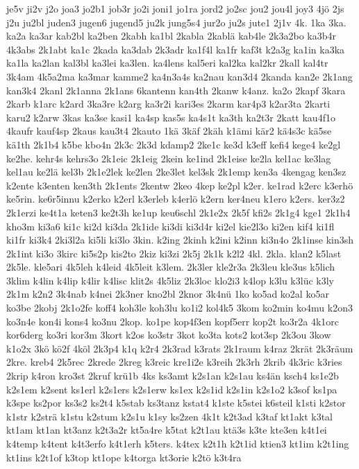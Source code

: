 {je5v
ji2v
j2o
joa3
jo2b1
job3r
jo2i
joni1
jo1ra
jord2
jo2sc
jou2
jou4l
joy3
4jö
2js
j2u
ju2bl
juden3
jugen6
jugend5
ju2k
jung5s4
jur2o
ju2s
jute1
2j1v
4k.
1ka
3ka.
ka2a
ka3ar
kab2bl
ka2ben
2kabh
ka1bl
2kabla
2kablä
kab4le
2k3a2bo
ka3b4r
4k3abs
2k1abt
ka1c
2kada
ka3dab
2k3adr
ka1f4l
ka1fr
kaf3t
k2a3g
ka1in
ka3ka
ka1la
ka2lan
kal3bl
ka3lei
ka3len.
ka4lens
kal5eri
kal2ka
kal2kr
2kall
kal4tr
3k4am
4k5a2ma
ka3mar
kamme2
ka4n3a4s
ka2nau
kan3d4
2kanda
kan2e
2k1ang
kan3k4
2kanl
2k1anna
2k1ans
6kantenn
kan4th
2kanw
k4anz.
ka2o
2kapf
3kara
2karb
k1arc
k2ard
3ka3re
k2arg
ka3r2i
kari3es
2karm
kar4p3
k2ar3ta
2karti
karu2
k2arw
3kas
ka3se
kasi1
ka4sp
kas5s
ka4s1t
ka3th
ka2t3r
2katt
kau4f1o
4kaufr
kauf4sp
2kaus
kau3t4
2kauto
1kä
3käf
2käh
k1ämi
kär2
kä4s3c
kä5se
kä1th
2k1b4
k5be
kbo4n
2k3c
2k3d
kdamp2
2ke1c
ke3d
k3eff
kefi4
kege4
ke2gl
ke2he.
kehr4s
kehrs3o
2k1eic
2k1eig
2kein
ke1ind
2k1eise
ke2la
kel1ac
ke3lag
kel1au
ke2lä
kel3b
2k1e2lek
ke2len
2ke3let
kel3sk
2k1emp
ken3a
4kengag
ken3sz
k2ente
k3enten
ken3th
2k1ents
2kentw
2keo
4kep
ke2pl
k2er.
ke1rad
k2erc
k3erhö
ke5rin.
ke6r5innu
k2erko
k2erl
k3erleb
k4erlö
k2ern
ker4neu
k1ero
k2ers.
ker3z2
2k1erzi
ke4t1a
keten3
ke2t3h
ke1up
keu6schl
2k1e2x
2k5f
kfi2s
2k1g4
kge1
2k1h4
kho3m
ki3a6
ki1c
ki2d
ki3da
2k1ide
ki3di
ki3d4r
ki2el
kie2l3o
ki2en
kif4
ki1fl
ki1fr
ki3k4
2ki3l2a
ki5li
ki3lo
3kin.
k2ing
2kinh
k2ini
k2inn
ki3n4o
2k1inse
kin3sh
2k1int
ki3o
3kirc
ki5s2p
kis2to
2kiz
ki3zi
2k5j
2k1k
k2l2
4kl.
2kla.
klan2
k5last
2k5le.
kle5ari
4k5leh
k4leid
4k5leit
k3lem.
2k3ler
kle2r3a
2k3leu
kle3us
k5lich
3klim
k4lin
k4lip
k4lir
k4lisc
klit2s
4k5liz
2k3loc
klo2i3
k4lop
k3lu
k3lüc
k3ly
2k1m
k2n2
3k4nab
k4nei
2k3ner
kno2bl
2knor
3k4nü
1ko
ko5ad
ko2al
ko5ar
ko3be
2kobj
2k1o2fe
koff4
koh3le
koh3lu
ko1i2
kol4k5
3kom
ko2min
ko4mu
k2on3
ko3n4e
kon4i
kons4
ko3nu
2kop.
ko1pe
kop4f3en
kopf5err
kop2t
ko3r2a
4k1orc
kor6derg
ko3ri
kor3m
3kort
k2os
ko3str
3kot
ko3ta
kots2
kot3sp
2k3ou
3kow
k1o2x
3kö
kö2f
4köl
2k3p4
k1q
k2r4
2k3rad
k3rats
2k1raum
k4raz
2krät
2k3räum
2kre.
kreb4
2k5rec
2krede
2kreg
k3reic
kre1i2e
k3reih
2k3rh
2krib
4k3ric
k3ries
2krip
k4ron
kro3st
2kruf
krü1b
4ks
ks3amt
k2s1an
k2s1au
ks4än
ksch4
ks1e2b
k2s1em
k2sent
ks1erl
k2s1ers
k2s1erw
ks1ex
k2s1id
k2s1in
k2s1o2
k3sof
ks1pa
k3spe
ks2por
ks3s2
ks2t4
k5stab
ks3tanz
kstat4
k1ste
k5stei
k6steil
k1sti
k2stor
k1str
k2strä
k1stu
k2stum
k2s1u
k1sy
ks2zen
4k1t
k2t3ad
k3taf
kt1akt
k3tal
kt1am
kt1an
kt3anz
k2t3a2r
kt5a4re
k5tat
k2t1au
ktä3s
k3te
kte3en
k4t1ei
k4temp
k4tent
k4t3erfo
k4t1erh
k5ters.
k4tex
k2t1h
k2t1id
ktien3
kt1im
k2t1ing
kt1ins
k2t1of
k3top
kt1ope
k4torga
kt3orie
k2tö
k3t4ra
}

